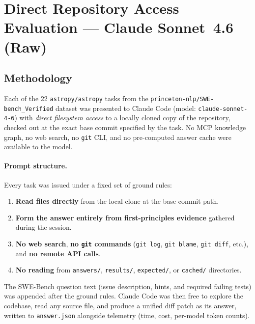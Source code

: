 
\section{Direct Repository Access Evaluation --- Claude Sonnet~4.6 (Raw)}\label{sec:raw-sonnet}

\subsection{Methodology}

Each of the 22 \texttt{astropy/astropy} tasks from the
\texttt{princeton-nlp/SWE-bench\_Verified} dataset was presented to
Claude Code (model: \texttt{claude-sonnet-4-6}) with \emph{direct
filesystem access} to a locally cloned copy of the repository, checked
out at the exact base commit specified by the task.
No MCP knowledge graph, no web search, no \texttt{git} CLI, and no
pre-computed answer cache were available to the model.

\paragraph{Prompt structure.}
Every task was issued under a fixed set of ground rules:

\begin{enumerate}
  \item \textbf{Read files directly} from the local clone at the
        base-commit path.
  \item \textbf{Form the answer entirely from first-principles evidence}
        gathered during the session.
  \item \textbf{No web search}, \textbf{no \texttt{git} commands}
        (\texttt{git log}, \texttt{git blame}, \texttt{git diff}, etc.),
        and \textbf{no remote API calls}.
  \item \textbf{No reading} from \texttt{answers/}, \texttt{results/},
        \texttt{expected/}, or \texttt{cached/} directories.
\end{enumerate}

\noindent
The SWE-Bench question text (issue description, hints, and required
failing tests) was appended after the ground rules.
Claude Code was then free to explore the codebase, read any source file,
and produce a unified diff patch as its answer, written to
\texttt{answer.json} alongside telemetry (time, cost, per-model token
counts).

